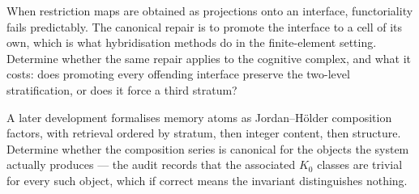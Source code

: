 \begin{openproblem}\label{op:hybrid}
When restriction maps are obtained as projections onto an interface,
functoriality fails predictably. The canonical repair is to promote the
interface to a cell of its own, which is what hybridisation methods do in
the finite-element setting. Determine whether the same repair applies to
the cognitive complex, and what it costs: does promoting every offending
interface preserve the two-level stratification, or does it force a third
stratum?
\end{openproblem}

\begin{openproblem}\label{op:jordanholder}
A later development formalises memory atoms as Jordan--H\"older
composition factors, with retrieval ordered by stratum, then integer
content, then structure. Determine whether the composition series is
canonical for the objects the system actually produces --- the audit
records that the associated $K_0$ classes are trivial for every such
object, which if correct means the invariant distinguishes nothing.
\end{openproblem}
